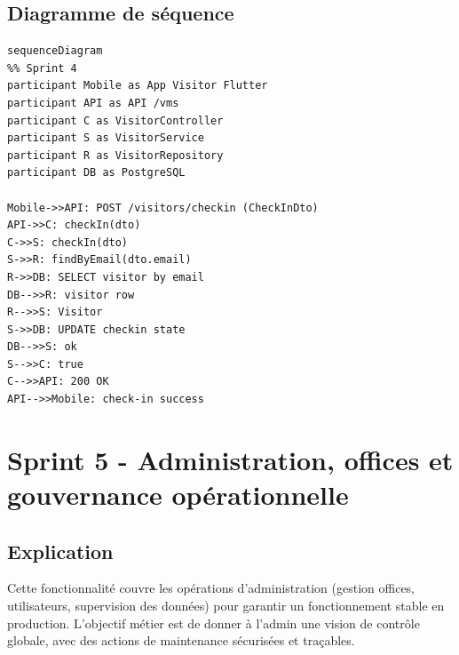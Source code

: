 \documentclass[12pt,a4paper]{article}
\begin{document}
\subsection*{Diagramme de séquence}
\begin{verbatim}
sequenceDiagram
%% Sprint 4
participant Mobile as App Visitor Flutter
participant API as API /vms
participant C as VisitorController
participant S as VisitorService
participant R as VisitorRepository
participant DB as PostgreSQL

Mobile->>API: POST /visitors/checkin (CheckInDto)
API->>C: checkIn(dto)
C->>S: checkIn(dto)
S->>R: findByEmail(dto.email)
R->>DB: SELECT visitor by email
DB-->>R: visitor row
R-->>S: Visitor
S->>DB: UPDATE checkin state
DB-->>S: ok
S-->>C: true
C-->>API: 200 OK
API-->>Mobile: check-in success
\end{verbatim}

\section*{Sprint 5 - Administration, offices et gouvernance opérationnelle}
\subsection*{Explication}
Cette fonctionnalité couvre les opérations d’administration (gestion offices, utilisateurs, supervision des données) pour garantir un fonctionnement stable en production. L’objectif métier est de donner à l’admin une vision de contrôle globale, avec des actions de maintenance sécurisées et traçables.
\end{document}
